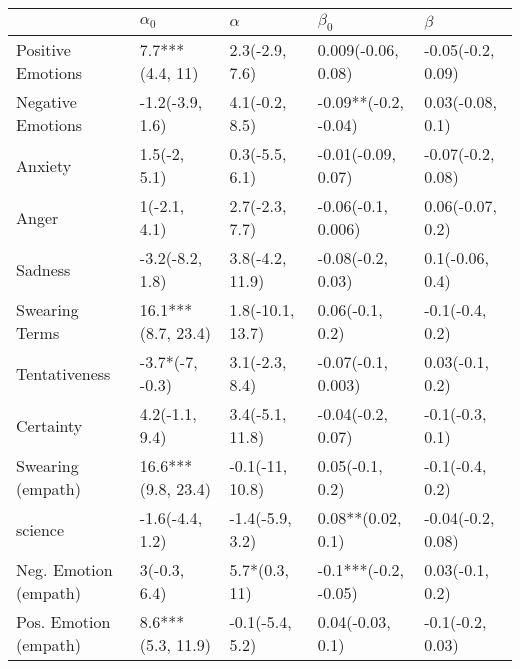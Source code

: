 \begin{tabular}{lllll}
\toprule
{} &          $\alpha_0$ &          $\alpha$ &             $\beta_0$ &            $\beta$ \\
\midrule
Positive Emotions     &     7.7***(4.4, 11) &    2.3(-2.9, 7.6) &    0.009(-0.06, 0.08) &  -0.05(-0.2, 0.09) \\
Negative Emotions     &     -1.2(-3.9, 1.6) &    4.1(-0.2, 8.5) &  -0.09**(-0.2, -0.04) &   0.03(-0.08, 0.1) \\
Anxiety               &        1.5(-2, 5.1) &    0.3(-5.5, 6.1) &    -0.01(-0.09, 0.07) &  -0.07(-0.2, 0.08) \\
Anger                 &        1(-2.1, 4.1) &    2.7(-2.3, 7.7) &    -0.06(-0.1, 0.006) &   0.06(-0.07, 0.2) \\
Sadness               &     -3.2(-8.2, 1.8) &   3.8(-4.2, 11.9) &     -0.08(-0.2, 0.03) &    0.1(-0.06, 0.4) \\
Swearing Terms        &  16.1***(8.7, 23.4) &  1.8(-10.1, 13.7) &       0.06(-0.1, 0.2) &    -0.1(-0.4, 0.2) \\
Tentativeness         &     -3.7*(-7, -0.3) &    3.1(-2.3, 8.4) &    -0.07(-0.1, 0.003) &    0.03(-0.1, 0.2) \\
Certainty             &      4.2(-1.1, 9.4) &   3.4(-5.1, 11.8) &     -0.04(-0.2, 0.07) &    -0.1(-0.3, 0.1) \\
Swearing (empath)     &  16.6***(9.8, 23.4) &   -0.1(-11, 10.8) &       0.05(-0.1, 0.2) &    -0.1(-0.4, 0.2) \\
science               &     -1.6(-4.4, 1.2) &   -1.4(-5.9, 3.2) &     0.08**(0.02, 0.1) &  -0.04(-0.2, 0.08) \\
Neg. Emotion (empath) &        3(-0.3, 6.4) &     5.7*(0.3, 11) &  -0.1***(-0.2, -0.05) &    0.03(-0.1, 0.2) \\
Pos. Emotion (empath) &   8.6***(5.3, 11.9) &   -0.1(-5.4, 5.2) &      0.04(-0.03, 0.1) &   -0.1(-0.2, 0.03) \\
\bottomrule
\end{tabular}
